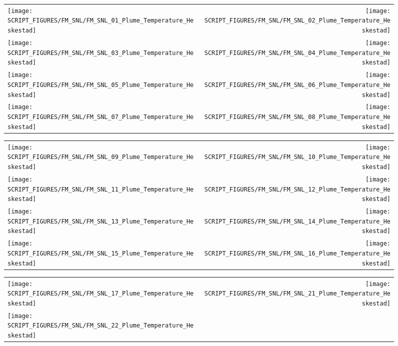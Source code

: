 \begin{figure}[p]
\begin{tabular*}{\textwidth}{l@{\extracolsep{\fill}}r}
\texttt{[image: SCRIPT\_FIGURES/FM\_SNL/FM\_SNL\_01\_Plume\_Temperature\_Heskestad]} &
\texttt{[image: SCRIPT\_FIGURES/FM\_SNL/FM\_SNL\_02\_Plume\_Temperature\_Heskestad]} \\
\texttt{[image: SCRIPT\_FIGURES/FM\_SNL/FM\_SNL\_03\_Plume\_Temperature\_Heskestad]} &
\texttt{[image: SCRIPT\_FIGURES/FM\_SNL/FM\_SNL\_04\_Plume\_Temperature\_Heskestad]} \\
\texttt{[image: SCRIPT\_FIGURES/FM\_SNL/FM\_SNL\_05\_Plume\_Temperature\_Heskestad]} &
\texttt{[image: SCRIPT\_FIGURES/FM\_SNL/FM\_SNL\_06\_Plume\_Temperature\_Heskestad]} \\
\texttt{[image: SCRIPT\_FIGURES/FM\_SNL/FM\_SNL\_07\_Plume\_Temperature\_Heskestad]} &
\texttt{[image: SCRIPT\_FIGURES/FM\_SNL/FM\_SNL\_08\_Plume\_Temperature\_Heskestad]}
\end{tabular*}
\end{figure}

\begin{figure}[p]
\begin{tabular*}{\textwidth}{l@{\extracolsep{\fill}}r}
\texttt{[image: SCRIPT\_FIGURES/FM\_SNL/FM\_SNL\_09\_Plume\_Temperature\_Heskestad]} &
\texttt{[image: SCRIPT\_FIGURES/FM\_SNL/FM\_SNL\_10\_Plume\_Temperature\_Heskestad]} \\
\texttt{[image: SCRIPT\_FIGURES/FM\_SNL/FM\_SNL\_11\_Plume\_Temperature\_Heskestad]} &
\texttt{[image: SCRIPT\_FIGURES/FM\_SNL/FM\_SNL\_12\_Plume\_Temperature\_Heskestad]} \\
\texttt{[image: SCRIPT\_FIGURES/FM\_SNL/FM\_SNL\_13\_Plume\_Temperature\_Heskestad]} &
\texttt{[image: SCRIPT\_FIGURES/FM\_SNL/FM\_SNL\_14\_Plume\_Temperature\_Heskestad]} \\
\texttt{[image: SCRIPT\_FIGURES/FM\_SNL/FM\_SNL\_15\_Plume\_Temperature\_Heskestad]} &
\texttt{[image: SCRIPT\_FIGURES/FM\_SNL/FM\_SNL\_16\_Plume\_Temperature\_Heskestad]}
\end{tabular*}
\end{figure}

\begin{figure}[p]
\begin{tabular*}{\textwidth}{l@{\extracolsep{\fill}}r}
\texttt{[image: SCRIPT\_FIGURES/FM\_SNL/FM\_SNL\_17\_Plume\_Temperature\_Heskestad]} &
\texttt{[image: SCRIPT\_FIGURES/FM\_SNL/FM\_SNL\_21\_Plume\_Temperature\_Heskestad]} \\
\texttt{[image: SCRIPT\_FIGURES/FM\_SNL/FM\_SNL\_22\_Plume\_Temperature\_Heskestad]}
\end{tabular*}
\end{figure}


